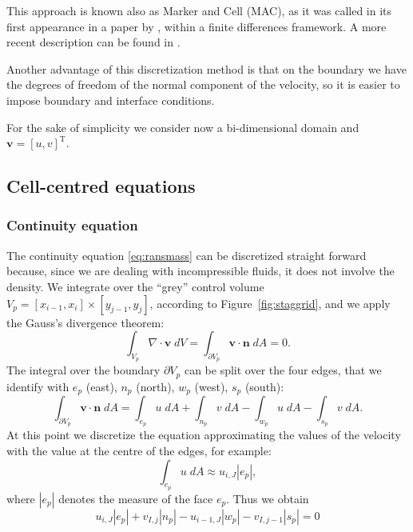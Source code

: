 This approach is known also as Marker and Cell (MAC), as it was called in its 
first appearance in a paper by \textcite{stagg:orig}, within a finite 
differences framework. A more recent description can be found in 
\cite{main:vermal}.

Another advantage of this discretization method is that on the boundary we have 
the degrees of freedom of the normal component of the velocity, so it is easier 
to impose boundary and interface conditions.

For the sake of simplicity we consider now a bi-dimensional domain and 
$\mathbf{v} = [u, v]^{\mathrm{T}}$.
%
\subsection{Cell-centred equations}
\subsubsection{Continuity equation}
The continuity equation \eqref{eq:ransmass} can be discretized straight forward 
because, since we are dealing with incompressible fluids, it does not involve 
the density. We integrate over the ``grey'' control 
volume $V_p = [x_{i-1},x_i] \times [y_{j-1},y_j]$, according to 
Figure~\ref{fig:staggrid}, 
and we apply the Gauss's divergence theorem:
\begin{equation}
\int_{V_p} \nabla \cdot \mathbf{v} \; dV = \int_{\partial V_p} \mathbf{v} \cdot 
\mathbf{n} \; dA = 0.
\end{equation}
The integral over the boundary $\partial V_p$ can be split over the four edges, 
that we identify with $e_p$ (east), $n_p$ (north), $w_p$ (west), $s_p$ (south):
\begin{equation}
\int_{\partial V_p} \mathbf{v} \cdot \mathbf{n} \; dA = \int_{e_p} u \; dA
+ \int_{n_p} v \; dA - \int_{w_p} u \; dA - \int_{s_p} v \; dA.
\end{equation}
At this point we discretize the equation approximating the values of the 
velocity with the value at the centre of the edges, for example:
\begin{equation}
\int_{e_p} u \; dA \approx u_{i,J} |e_p|,
\end{equation}
where $|e_p|$ denotes the measure of the face $e_p$. Thus we obtain
\begin{equation}
	u_{i,J} |e_p| + v_{I,j}|n_p| - u_{i-1,J}|w_p| - v_{I,j-1}|s_p| = 0
\end{equation}
